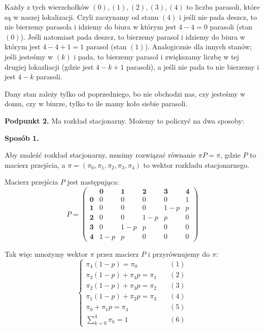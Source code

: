 Każdy z tych wierzchołków \((0), (1), (2), (3), (4)\) to liczba parasoli, które są w naszej lokalizacji.
Czyli zaczynamy od stanu \((4)\) i jeśli nie pada deszcz, to nie bierzemy parasola i idziemy do biura w którym jest \(4 - 4 = 0\) parasoli (stan \((0)\)).
Jeśli natomiast pada deszcz, to bierzemy parasol i idziemy do biura w którym jest \(4 - 4 + 1 = 1\) parasol (stan \((1)\)).
Analogicznie dla innych stanów; jeśli jesteśmy w \((k)\) i pada, to bierzemy parasol i zwiększamy liczbę w tej drugiej lokazliacji (gdzie jest \(4 - k + 1\) parasoli), a jeśli nie pada to nie bierzemy i jest \(4 - k\) parasoli.

Dany stan zależy tylko od poprzedniego, bo nie obchodzi nas, czy jesteśmy w domu, czy w biurze, tylko to ile mamy koło siebie parasoli.

\textbf{Podpunkt 2.}
Ma rozkład stacjonarny. Możemy to policzyć na dwa sposoby:

\textbf{Sposób 1.}

Aby znaleźć rozkład stacjonarny, musimy rozwiązać równanie \(\pi P = \pi\), gdzie \(P\) to macierz przejścia, a \(\pi = (\pi_0, \pi_1, \pi_2, \pi_3, \pi_4)\) to wektor rozkładu stacjonarnego.

Macierz przejścia \(P\) jest następująca:
\[
	P = \begin{pmatrix}
		           & \mathbf{0} & \mathbf{1} & \mathbf{2} & \mathbf{3} & \mathbf{4} \\
		\mathbf{0} & 0          & 0          & 0          & 0          & 1          \\
		\mathbf{1} & 0          & 0          & 0          & 1-p        & p          \\
		\mathbf{2} & 0          & 0          & 1-p        & p          & 0          \\
		\mathbf{3} & 0          & 1-p        & p          & 0          & 0          \\
		\mathbf{4} & 1-p        & p          & 0          & 0          & 0
	\end{pmatrix}
\]

Tak więc mnożymy wektor \(\pi\) przez macierz \(P\) i przyrównujemy do \(\pi\):
\[
	\begin{cases}
		\pi_4(1-p) = \pi_0 \quad           & (1) \\
		\pi_3(1-p) + \pi_4 p = \pi_1 \quad & (2) \\
		\pi_2(1-p) + \pi_3 p = \pi_2 \quad & (3) \\
		\pi_1(1-p) + \pi_2 p = \pi_3 \quad & (4) \\
		\pi_0 + \pi_1 p = \pi_4 \quad      & (5) \\
		\sum_{k=0}^{4} \pi_k = 1 \quad     & (6)
	\end{cases}
\]

